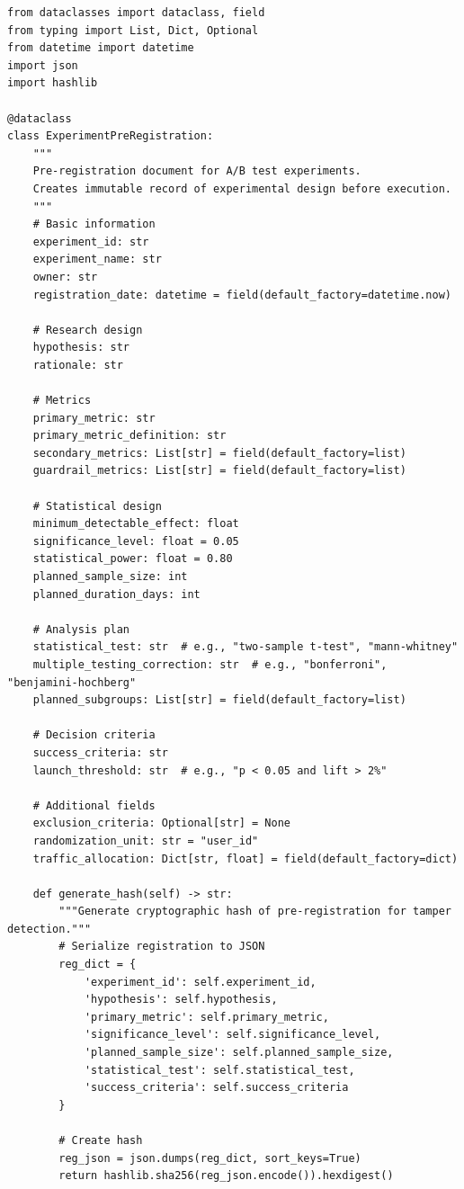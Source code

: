 \lstset{language=Python, caption=Pre-registration Framework}
\begin{lstlisting}
from dataclasses import dataclass, field
from typing import List, Dict, Optional
from datetime import datetime
import json
import hashlib

@dataclass
class ExperimentPreRegistration:
    """
    Pre-registration document for A/B test experiments.
    Creates immutable record of experimental design before execution.
    """
    # Basic information
    experiment_id: str
    experiment_name: str
    owner: str
    registration_date: datetime = field(default_factory=datetime.now)

    # Research design
    hypothesis: str
    rationale: str

    # Metrics
    primary_metric: str
    primary_metric_definition: str
    secondary_metrics: List[str] = field(default_factory=list)
    guardrail_metrics: List[str] = field(default_factory=list)

    # Statistical design
    minimum_detectable_effect: float
    significance_level: float = 0.05
    statistical_power: float = 0.80
    planned_sample_size: int
    planned_duration_days: int

    # Analysis plan
    statistical_test: str  # e.g., "two-sample t-test", "mann-whitney"
    multiple_testing_correction: str  # e.g., "bonferroni", "benjamini-hochberg"
    planned_subgroups: List[str] = field(default_factory=list)

    # Decision criteria
    success_criteria: str
    launch_threshold: str  # e.g., "p < 0.05 and lift > 2%"

    # Additional fields
    exclusion_criteria: Optional[str] = None
    randomization_unit: str = "user_id"
    traffic_allocation: Dict[str, float] = field(default_factory=dict)

    def generate_hash(self) -> str:
        """Generate cryptographic hash of pre-registration for tamper detection."""
        # Serialize registration to JSON
        reg_dict = {
            'experiment_id': self.experiment_id,
            'hypothesis': self.hypothesis,
            'primary_metric': self.primary_metric,
            'significance_level': self.significance_level,
            'planned_sample_size': self.planned_sample_size,
            'statistical_test': self.statistical_test,
            'success_criteria': self.success_criteria
        }

        # Create hash
        reg_json = json.dumps(reg_dict, sort_keys=True)
        return hashlib.sha256(reg_json.encode()).hexdigest()


\end{lstlisting}

